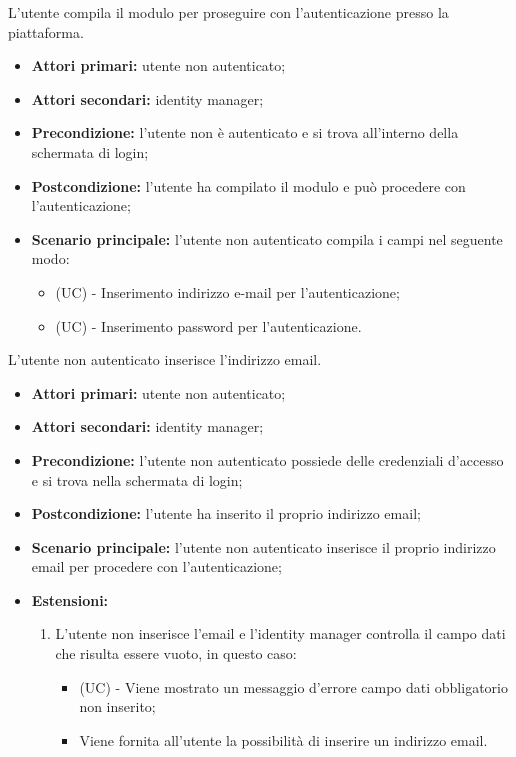 \resetSubUC
{}
L'utente compila il modulo per proseguire con l'autenticazione presso la piattaforma.
\begin{itemize}
	\item \textbf{Attori primari:} utente non autenticato;
	\item \textbf{Attori secondari:} identity manager;
	\item \textbf{Precondizione:} l'utente non è autenticato e si trova all'interno della schermata di login;
	\item \textbf{Postcondizione:} l'utente ha compilato il modulo e può procedere con l'autenticazione;
	\item \textbf{Scenario principale:} l'utente non autenticato compila i campi nel seguente modo:
	\begin{itemize}
		\item (UC) - Inserimento indirizzo e-mail per l'autenticazione;
		\item (UC) - Inserimento password per l'autenticazione.
	\end{itemize}
\end{itemize}

L'utente non autenticato inserisce l'indirizzo email.
\begin{itemize}
	\item \textbf{Attori primari:} utente non autenticato;
	\item \textbf{Attori secondari:} identity manager;
	\item \textbf{Precondizione:} l'utente non autenticato possiede delle credenziali d'accesso e si trova nella schermata di login;
	\item \textbf{Postcondizione:}  l'utente ha inserito il proprio indirizzo email;
	\item \textbf{Scenario principale:} l'utente non autenticato inserisce il proprio indirizzo email per procedere con l'autenticazione;
	\item \textbf{Estensioni:}
	\begin{enumerate}
		\item L'utente non inserisce l'email e l'identity manager controlla il campo dati che risulta essere vuoto, in questo caso:
		\begin{itemize}
			\item (UC) - Viene mostrato un messaggio d'errore campo dati obbligatorio non inserito;
			\item Viene fornita all'utente la possibilità di inserire un indirizzo email.
		\end{itemize}
	\end{enumerate}
\end{itemize}

